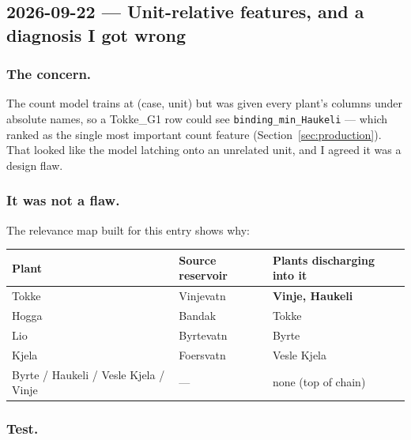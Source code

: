 \subsection{2026-09-22 --- Unit-relative features, and a diagnosis I got wrong}
\label{sec:unitrel}

\subsubsection*{The concern.} The count model trains at (case, unit) but was given every plant's
columns under absolute names, so a Tokke\_G1 row could see \texttt{binding\_min\_Haukeli} --- which
ranked as the single most important count feature (Section~\ref{sec:production}). That looked like
the model latching onto an unrelated unit, and I agreed it was a design flaw.

\subsubsection*{It was not a flaw.} The relevance map built for this entry shows why:

\begin{center}
\begin{tabular}{lll}
\toprule
Plant & Source reservoir & Plants discharging into it \\
\midrule
Tokke & Vinjevatn & \textbf{Vinje, Haukeli} \\
Hogga & Bandak & Tokke \\
Lio & Byrtevatn & Byrte \\
Kjela & Foersvatn & Vesle Kjela \\
Byrte / Haukeli / Vesle Kjela / Vinje & --- & none (top of chain) \\
\bottomrule
\end{tabular}
\end{center}


\subsubsection*{Test.}


